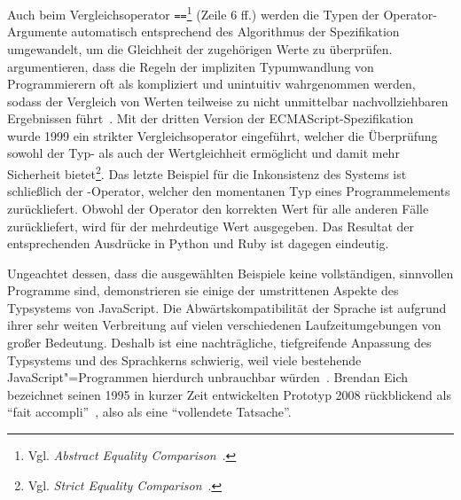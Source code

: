 Auch beim Vergleichsoperator \texttt{==}\footnote{Vgl. \textit{Abstract Equality Comparison}~\autocite[68]{ECMASCRIPT:2019}.} (Zeile 6 ff.) werden die Typen der Operator-Argumente automatisch entsprechend des Algorithmus der Spezifikation umgewandelt, um die Gleichheit der zugehörigen Werte zu überprüfen. \citeauthor{PRADEL:2015} argumentieren, dass die Regeln der impliziten Typumwandlung von Programmierern oft als kompliziert und unintuitiv wahrgenommen werden, sodass der Vergleich von Werten teilweise zu nicht unmittelbar nachvollziehbaren Ergebnissen führt~\autocite{PRADEL:2015}.
Mit der dritten Version der ECMAScript-Spezifikation~\autocite{ECMASCRIPT:1999} wurde 1999 ein strikter Vergleichsoperator \code{===} eingeführt, welcher die Überprüfung sowohl der Typ- als auch der Wertgleichheit ermöglicht und damit mehr Sicherheit bietet\footnote{Vgl. \textit{Strict Equality Comparison}~\autocite[68]{ECMASCRIPT:2019}.}.
Das letzte Beispiel für die Inkonsistenz des Systems ist schließlich der -Operator, welcher den momentanen Typ eines Programmelements zurückliefert. Obwohl der Operator den korrekten Wert für alle anderen Fälle zurückliefert, wird für  der mehrdeutige Wert  ausgegeben. Das Resultat der entsprechenden Ausdrücke in Python und Ruby ist dagegen eindeutig.

Ungeachtet dessen, dass die ausgewählten Beispiele keine vollständigen, sinnvollen Programme sind, demonstrieren sie einige der umstrittenen Aspekte des Typsystems von JavaScript. Die Abwärtskompatibilität der Sprache ist aufgrund ihrer sehr weiten Verbreitung auf vielen verschiedenen Laufzeitumgebungen von großer Bedeutung. Deshalb ist eine nachträgliche, tiefgreifende Anpassung des Typsystems und des Sprachkerns schwierig, weil viele bestehende JavaScript"=Programmen hierdurch unbrauchbar würden~\autocite[1]{CROCKFORD:JS_GOOD_PARTS}. Brendan Eich bezeichnet seinen 1995 in kurzer Zeit entwickelten Prototyp 2008 rückblickend als \enquote{fait accompli}~\autocite{EICH:POPULARITY}, also als eine \enquote{vollendete Tatsache}.

